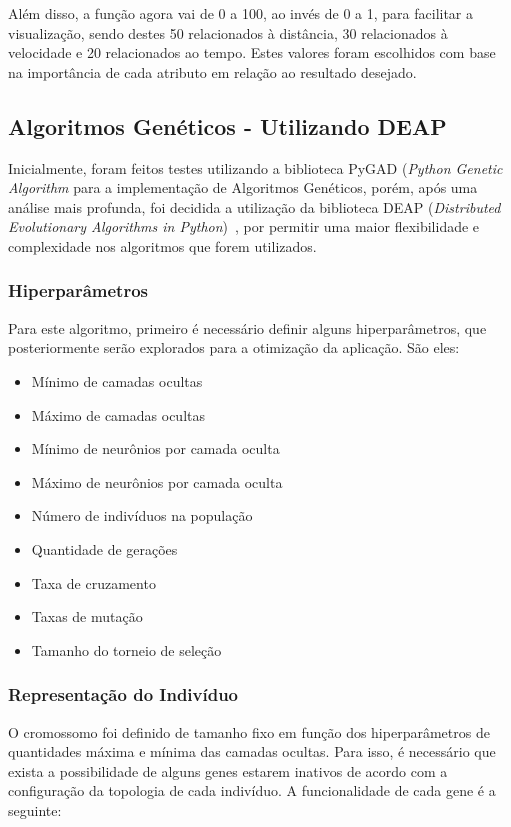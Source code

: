 \documentclass[12pt]{article}
\begin{document}
Além disso, a função agora vai de 0 a 100, ao invés de 0 a 1, para facilitar a visualização, sendo destes 50 relacionados à distância, 30 relacionados à velocidade e 20 relacionados ao tempo. Estes valores foram escolhidos com base na importância de cada atributo em relação ao resultado desejado.

\subsection{Algoritmos Genéticos - Utilizando DEAP}
Inicialmente, foram feitos testes utilizando a biblioteca PyGAD (\textit{Python Genetic Algorithm} \cite{DBLP:journals/corr/abs-2106-06158} para a implementação de Algoritmos Genéticos, porém, após uma análise mais profunda, foi decidida a utilização da biblioteca DEAP (\textit{Distributed Evolutionary Algorithms in Python})~\cite{DEAP_JMLR2012}, por permitir uma maior flexibilidade e complexidade nos algoritmos que forem utilizados.

\subsubsection{Hiperparâmetros}
Para este algoritmo, primeiro é necessário definir alguns hiperparâmetros, que posteriormente serão explorados para a otimização da aplicação. São eles:
\begin{itemize}
    \item Mínimo de camadas ocultas
    \item Máximo de camadas ocultas
    \item Mínimo de neurônios por camada oculta
    \item Máximo de neurônios por camada oculta
    \item Número de indivíduos na população
    \item Quantidade de gerações
    \item Taxa de cruzamento
    \item Taxas de mutação
    \item Tamanho do torneio de seleção
\end{itemize}

\subsubsection{Representação do Indivíduo}
O cromossomo foi definido de tamanho fixo em função dos hiperparâmetros de quantidades máxima e mínima das camadas ocultas. Para isso, é necessário que exista a possibilidade de alguns genes estarem inativos de acordo com a configuração da topologia de cada indivíduo. A funcionalidade de cada gene é a seguinte:
\end{document}
